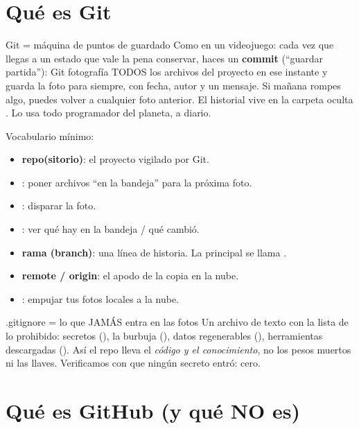 \documentclass[11pt,a4paper]{article}
\begin{document}

\section{Qué es Git}

\begin{concepto}{Git = máquina de puntos de guardado}
Como en un videojuego: cada vez que llegas a un estado que vale la pena conservar, haces un
\textbf{commit} (``guardar partida''): Git fotografía TODOS los archivos del proyecto en ese
instante y guarda la foto para siempre, con fecha, autor y un mensaje. Si mañana rompes algo,
puedes volver a cualquier foto anterior. El historial vive en la carpeta oculta .
Lo usa todo programador del planeta, a diario.
\end{concepto}

Vocabulario mínimo:
\begin{itemize}
  \item \textbf{repo(sitorio)}: el proyecto vigilado por Git.
  \item {}: poner archivos ``en la bandeja'' para la próxima foto.
  \item {}: disparar la foto.
  \item {}: ver qué hay en la bandeja / qué cambió.
  \item \textbf{rama (branch)}: una línea de historia. La principal se llama .
  \item \textbf{remote / origin}: el apodo de la copia en la nube.
  \item {}: empujar tus fotos locales a la nube.
\end{itemize}

\begin{concepto}{.gitignore = lo que JAMÁS entra en las fotos}
Un archivo de texto con la lista de lo prohibido: secretos (), la
burbuja (), datos regenerables (), herramientas descargadas
(). Así el repo lleva el \emph{código y el conocimiento}, no los pesos muertos
ni las llaves. Verificamos con  que ningún secreto entró: cero.
\end{concepto}

\section{Qué es GitHub (y qué NO es)}
\end{document}
